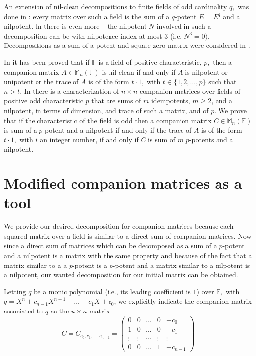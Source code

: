 \documentclass[11pt]{amsart}
\theoremstyle{definition}
\numberwithin{equation}{section}
\newcommand{\F}{\mathbb{F}}
\begin{document}
An extension of nil-clean decompositions to finite fields of odd cardinality $q,$ was done in \cite{AM}: every matrix over such a field is the sum of a $q$-potent $E=E^q$ and a nilpotent. In \cite{B} there is even more -- the nilpotent $N$ involved in such a decomposition can be with nilpotence index at most $3$ (i.e. $N^3=0).$ Decompositions as a sum of a potent and square-zero matrix were considered in \cite{DGGL}.

In \cite{BM} it has been proved that if $\F$ is a field of positive characteristic, $p,$ then a companion matrix $A\in \mathbb{M}_n(\F)$ is nil-clean if and only if $A$ is nilpotent or unipotent or the trace of $A$ is of the form $t\cdot 1,$ with $t\in \{1,2,\dots,p\}$ such that $n>t$. In \cite{C} there is a characterization of $n\times n$ companion matrices over fields of positive odd characteristic $p$ that are sums of $m$ idempotents, $m\geq 2$,  and a nilpotent, in terms of dimension, and trace of such a matrix, and of $p.$ We prove that if the characteristic of the field is odd then a companion matrix $C\in \mathbb{M}_n(\F)$ is sum of a $p$-potent and a nilpotent if and only if the trace of $A$ is of the form $t\cdot 1,$ with $t$ an integer number, if and only if $C$ is sum of $m$ $p$-potents and a nilpotent.




\section{Modified companion matrices as a tool}
We provide our desired decomposition for companion matrices because each squared matrix over a field is similar to a direct sum of companion matrices. Now since a direct sum of matrices which can be decomposed as a sum of a $p$-potent and a nilpotent is a matrix with the same property and because of the fact that a matrix similar to a a $p$-potent is a $p$-potent and a matrix similar to a nilpotent is a nilpotent, our wanted decomposition for our initial matrix can be obtained.

Letting $q$ be a monic polynomial (i.e., its leading coefficient is $1$) over $\F,$ with $q=X^n+c_{n-1}X^{n-1}+\ldots+c_1X+c_0$, we explicitly indicate the companion matrix associated to $q$ as the $n\times n$ matrix
$$C=C_{c_0,c_1,\ldots, c_{n-1}}=\left(\begin{array}{ccccc}
0 & 0  &\ldots & 0 & -c_0 \\
1 & 0  &\ldots & 0 & -c_1\\
\vdots & \vdots  &\cdots  & \vdots & \vdots \\
0 & 0 &\ldots & 1 & -c_{n-1}
 \end{array}\right)$$
\end{document}

